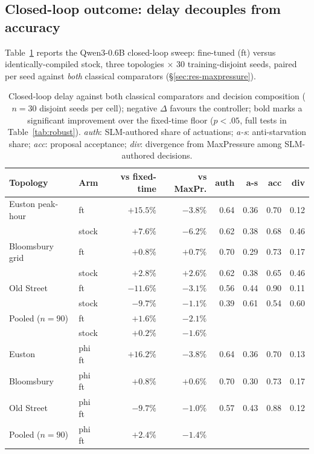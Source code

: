 \subsection{Closed-loop outcome: delay decouples from accuracy}\label{sec:res-closedloop}
Table~\ref{tab:closedloop-full} reports the Qwen3-0.6B closed-loop sweep:
fine-tuned (ft) versus identically-compiled stock, three topologies
$\times$ 30 training-disjoint seeds, paired per seed against \emph{both}
classical comparators (\S\ref{sec:res-maxpressure}).

\begin{table}[t]
\centering
\small
\begin{tabular}{llrrrrrr}
\toprule
Topology & Arm & vs fixed-time & vs MaxPr. & auth & a-s & acc & div \\
\midrule
Euston peak-hour & ft & $+15.5\%$ & $-3.8\%$ & 0.64 & 0.36 & 0.70 & 0.12 \\
 & stock & $+7.6\%$ & $-6.2\%$ & 0.62 & 0.38 & 0.68 & 0.46 \\
Bloomsbury grid & ft & $+0.8\%$ & $+0.7\%$ & 0.70 & 0.29 & 0.73 & 0.17 \\
 & stock & $+2.8\%$ & $+2.6\%$ & 0.62 & 0.38 & 0.65 & 0.46 \\
Old Street & ft & $\mathbf{-11.6\%}$ & $-3.1\%$ & 0.56 & 0.44 & 0.90 & 0.11 \\
 & stock & $\mathbf{-9.7\%}$ & $-1.1\%$ & 0.39 & 0.61 & 0.54 & 0.60 \\
\midrule
Pooled ($n{=}90$) & ft & $+1.6\%$ & $-2.1\%$ & & & & \\
 & stock & $+0.2\%$ & $-1.6\%$ & & & & \\
\midrule
Euston & phi ft & $+16.2\%$ & $-3.8\%$ & 0.64 & 0.36 & 0.70 & 0.13 \\
Bloomsbury & phi ft & $+0.8\%$ & $+0.6\%$ & 0.70 & 0.30 & 0.73 & 0.17 \\
Old Street & phi ft & $\mathbf{-9.7\%}$ & $-1.0\%$ & 0.57 & 0.43 & 0.88 & 0.12 \\
Pooled ($n{=}90$) & phi ft & $+2.4\%$ & $-1.4\%$ & & & & \\
\bottomrule
\end{tabular}
\caption{Closed-loop delay against both classical comparators and decision
composition ($n{=}30$ disjoint seeds per cell); negative $\Delta$ favours
the controller; bold marks a significant improvement over the fixed-time
floor ($p<.05$, full tests in Table~\ref{tab:robust}). \emph{auth}:
SLM-authored share of actuations; \emph{a-s}: anti-starvation share;
\emph{acc}: proposal acceptance; \emph{div}: divergence from MaxPressure
among SLM-authored decisions.}
\label{tab:closedloop-full}
\end{table}

